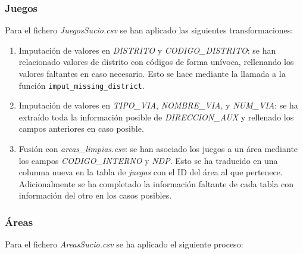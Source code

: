 \documentclass[]{article}
\begin{document}
\subsubsection{Juegos}
\label{subsubsec:preprocessjuego}
Para el fichero \textit{JuegosSucio.csv} se han aplicado las siguientes transformaciones:

\begin{enumerate}
    \item Imputación de valores en \textit{DISTRITO} y \textit{CODIGO\_DISTRITO}: se han relacionado valores de distrito con códigos de forma unívoca, rellenando los valores faltantes en caso necesario. Esto se hace mediante la llamada a la función \texttt{imput\_missing\_district}.
    \item Imputación de valores en \textit{TIPO\_VIA}, \textit{NOMBRE\_VIA}, y \textit{NUM\_VIA}: se ha extraído toda la información posible de \textit{DIRECCION\_AUX} y rellenado los campos anteriores en caso posible.
    \item Fusión con \textit{areas\_limpias.csv}: se han asociado los juegos a un área mediante los campos \textit{CODIGO\_INTERNO} y \textit{NDP}. Esto se ha traducido en una columna nueva en la tabla de \textit{juegos} con el ID del área al que pertenece. Adicionalmente se ha completado la información faltante de cada tabla con información del otro en los casos posibles.
\end{enumerate}

\subsubsection{Áreas}
\label{subsubsec:preprocessarea}
Para el fichero \textit{AreasSucio.csv} se ha aplicado el siguiente proceso:
\end{document}
